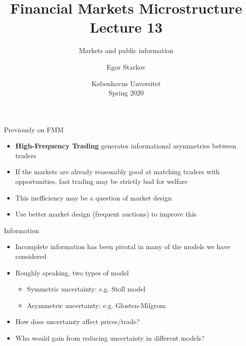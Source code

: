 \documentclass[english,10pt
,aspectratio=169
]{beamer}
\title{Financial Markets Microstructure \\ Lecture 13}
\subtitle{Markets and public information}
\author{Egor Starkov}
\date{K{\o}benhavns Unversitet \\
	Spring 2020}
\begin{document}
	\frame[plain]{\titlepage}


\begin{frame}{Previously on FMM}
	\begin{itemize}
		\item \textbf{High-Frequency Trading} generates informational asymmetries between traders
		\item If the markets are already reasonably good at matching traders with opportunities, fast trading may be strictly bad for welfare
		\item This inefficiency may be a question of market design
		\item Use better market design (frequent auctions) to improve this
	\end{itemize}
\end{frame}


\begin{frame}{Information}
	\begin{itemize}
		\item Incomplete information has been pivotal in many of the models we have considered
		\item Roughly speaking, two types of model
		\begin{itemize}
			\item Symmetric uncertainty: e.g. Stoll model
			\item Asymmetric uncertainty: e.g. Glosten-Milgrom
		\end{itemize}
		\item How does uncertainty affect prices/trade?
		\item Who would gain from reducing uncertainty in different models?
	\end{itemize}
\end{frame}


\end{document}
